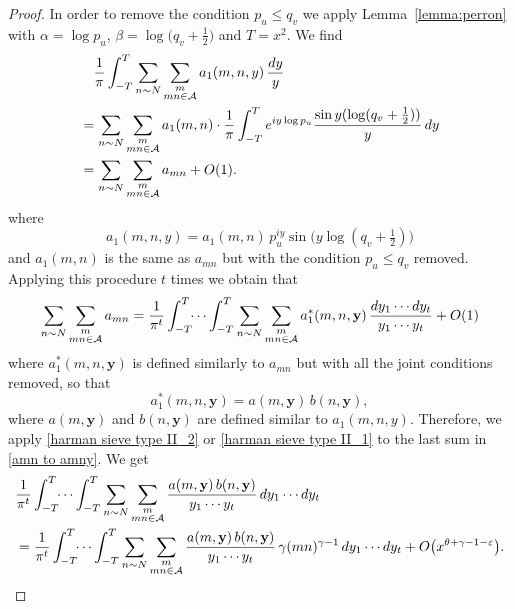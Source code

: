 \documentclass[12pt, reqno, twoside, letterpaper]{amsart}
\numberwithin{equation}{section}
\newcommand{\cA}{\ensuremath{\mathcal{A}}}
\theoremstyle{customthm}
\theoremstyle{customrem}
\def\int{\intop\nolimits}
\begin{document}
\begin{proof}
In order to remove the condition $p_u \leqslant q_v $ we apply Lemma~\ref{lemma:perron} with $\alpha = \log p_u$, $\beta = \log\bigl(q_v + \tfrac{1}{2}\bigr)$ and $T = x^2$. We find
\begin{align*}
	&\quad\frac{1}{\pi} \int_{-T}^{T} \sum_{n \sim N} \sum_{\substack{m \\ mn \in \cA}} a_1(m, n, y) \, \frac{dy}{y} \\
	&= \sum_{n \sim N} \sum_{\substack{m \\ mn \in \cA}} a_1(m,n) \cdot \frac{1}{\pi} \int_{-T}^{T} e^{iy\log p_u} \frac{\sin y(\log(q_v+\frac{1}{2}))}{y} \, dy \\
	&= \sum_{n \sim N} \sum_{\substack{m \\ mn \in \cA}} a_{mn} + O(1).
\end{align*}
where
\begin{equation*}
	a_1(m, n, y) = a_1(m,n) \, p_u^{iy} \sin \bigl(y \log(q_v + \tfrac{1}{2})\bigr)
\end{equation*}
and $ a_1(m, n)$ is the same as $a_{mn}$ but with the condition $p_u \leqslant q_v$ removed. Applying this procedure $t$ times we obtain that
\begin{align}\label{amn to amny}
	\sum_{n \sim N} \sum_{\substack{m \\ mn \in \cA}} a_{mn} = \frac{1}{\pi^t} \int_{-T}^{T} \!\!\cdots\ \!\! \int_{-T}^{T} \sum_{n \sim N} \sum_{\substack{m \\ mn \in \cA}} a^*_1(m, n, \mathbf{y}) \, \frac{dy_1 \cdots dy_t}{y_1 \cdots y_t} + O(1)
\end{align}
where $a^*_1(m, n, \mathbf{y})$ is defined similarly to $a_{mn}$  but with all the joint conditions removed, so that
\begin{equation*}
	a^*_1(m, n, \mathbf{y}) = a(m,\mathbf{y} ) \, b(n, \mathbf{y}),
\end{equation*}
where $a(m,\mathbf{y} )$ and $b(n, \mathbf{y})$ are defined similar to $a_1(m,n,y)$. Therefore, we apply \eqref{harman sieve type II_2} or \eqref{harman sieve type II_1}  to the last sum in \eqref{amn to amny}. We get
\begin{align*}
&\frac{1}{\pi^t} \int_{-T}^{T} \!\!\cdots\ \!\! \int_{-T}^{T} \sum_{n \sim N} \sum_{\substack{m \\ mn \in \cA}}  \frac{a(m, \mathbf{y}) \, b(n, \mathbf{y})}{y_1 \cdots y_t} \, dy_1 \cdots dy_t \\
&= \frac{1}{\pi^t} \int_{-T}^{T} \!\!\cdots\ \!\! \int_{-T}^{T} \sum_{n \sim N} \sum_{\substack{m \\ mn \in \cA}}  \frac{a(m, \mathbf{y}) \, b(n, \mathbf{y})}{y_1 \cdots y_t} \, \gamma(mn)^{\gamma-1} \, dy_1 \cdots dy_t + O\bigl(  x^{\theta+\gamma-1-\varepsilon}\bigr).

\end{align*}
\end{proof}
\end{document}
